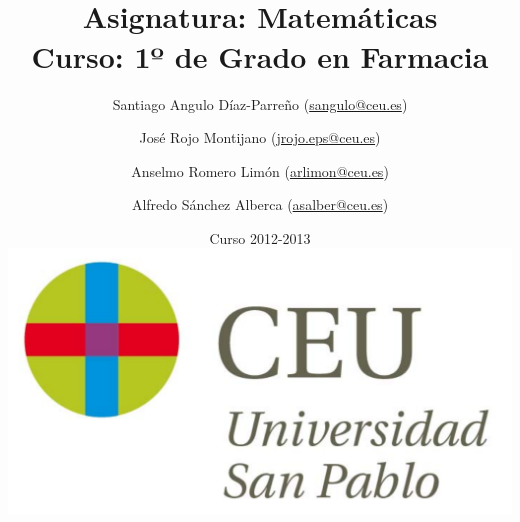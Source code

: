 \documentclass[a4paper,titlepage]{article}
\begin{document}
\sloppy

\title{\vskip 2cm
\shadowbox{\Huge \textbf{\textsf{\quad \textcolor[rgb]{0.00,0.00,0.50}{EJERCICIOS DE CÁLCULO}\quad}}}\\
   \vskip 1cm
   {\Large \textsf{\textcolor[rgb]{0.50,0.00,0.25}{Asignatura: Matemáticas }}}\\
   {\Large \textsf{\textcolor[rgb]{0.50,0.00,0.25}{Curso: 1º de Grado en Farmacia}}}
   }
\author{
   Santiago Angulo Díaz-Parreño (\url{sangulo@ceu.es})
   \and
   José Rojo Montijano (\url{jrojo.eps@ceu.es})
   \and
   Anselmo Romero Limón (\url{arlimon@ceu.es})
   \and
   Alfredo Sánchez Alberca (\url{asalber@ceu.es})
}
\date{Curso 2012-2013\\[1cm]
\includegraphics[scale=0.3]{img/logo_uspceu_01}}

\maketitle
\tableofcontents
\newpage








%
%
%



%
\end{document}
